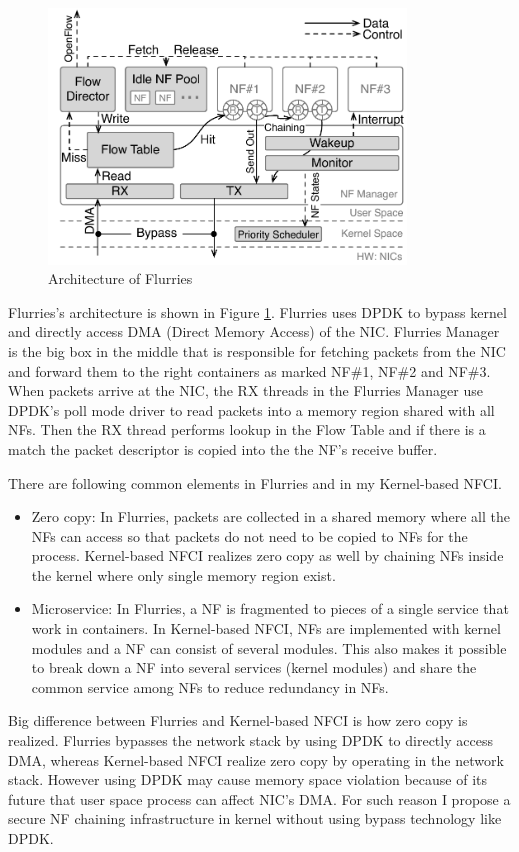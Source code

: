 \begin{figure}
	\centering
	\includegraphics[width=95mm]{pics/flurries_arc.pdf}
	\caption{Architecture of Flurries}
	\label{fig: flurries_arc}
\end{figure} 

Flurries's architecture is shown in Figure \ref{fig: flurries_arc}. Flurries uses DPDK to bypass kernel and directly access DMA\cite{DMA} (Direct Memory Access) of the NIC. Flurries Manager is the big box in the middle that is responsible for fetching packets from the NIC and forward them to the right containers as marked NF\#1, NF\#2 and NF\#3. When packets arrive at the NIC, the RX threads in the Flurries Manager use DPDK's poll mode driver to read packets into a memory region shared with all NFs. Then the RX thread performs lookup in the Flow Table and if there is a match the packet descriptor is copied into the the NF's receive buffer.  

There are following common elements in Flurries and in my Kernel-based NFCI.
\begin{itemize}
	\item Zero copy: In Flurries, packets are collected in a shared memory where all the NFs can access so that packets do not need to be copied to NFs for the process. Kernel-based NFCI realizes zero copy as well by chaining NFs inside the kernel where only single memory region exist. 
	\item Microservice: In Flurries, a NF is fragmented to pieces of a single service that work in containers. In Kernel-based NFCI, NFs are implemented with kernel modules and a NF can consist of several modules. This also makes it possible to break down a NF into several services (kernel modules) and share the common service among NFs to reduce redundancy in NFs. 
\end{itemize}

Big difference between Flurries and Kernel-based NFCI is how zero copy is realized. Flurries bypasses the network stack by using DPDK to directly access DMA, whereas Kernel-based NFCI realize zero copy by operating in the network stack. However using DPDK may cause memory space violation because of its future that user space process can affect NIC's DMA. For such reason I propose a secure NF chaining infrastructure in kernel without using bypass technology like DPDK. 






